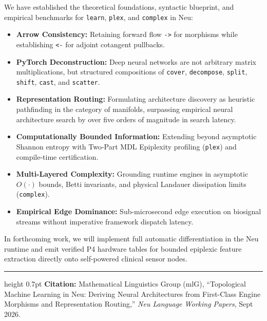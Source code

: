 \documentclass[11pt]{article}
\begin{document}
We have established the theoretical foundations, syntactic blueprint, and empirical benchmarks for \texttt{learn}, \texttt{plex}, and \texttt{complex} in Neu:
\begin{itemize}
    \item \textbf{Arrow Consistency:} Retaining forward flow \texttt{->} for morphisms while establishing \texttt{<-} for adjoint cotangent pullbacks.
    \item \textbf{PyTorch Deconstruction:} Deep neural networks are not arbitrary matrix multiplications, but structured compositions of \texttt{cover}, \texttt{decompose}, \texttt{split}, \texttt{shift}, \texttt{cast}, and \texttt{scatter}.
    \item \textbf{Representation Routing:} Formulating architecture discovery as heuristic pathfinding in the category of manifolds, surpassing empirical neural architecture search by over five orders of magnitude in search latency.
    \item \textbf{Computationally Bounded Information:} Extending beyond asymptotic Shannon entropy with Two-Part MDL Epiplexity profiling (\texttt{plex}) and compile-time certification.
    \item \textbf{Multi-Layered Complexity:} Grounding runtime engines in asymptotic $O(\cdot)$ bounds, Betti invariants, and physical Landauer dissipation limits (\texttt{complex}).
    \item \textbf{Empirical Edge Dominance:} Sub-microsecond edge execution on biosignal streams without imperative framework dispatch latency.
\end{itemize}

In forthcoming work, we will implement full automatic differentiation in the Neu runtime and emit verified P4 hardware tables for bounded epiplexic feature extraction directly onto self-powered clinical sensor nodes.

\vspace{0.6em}
\noindent\hrule height 0.7pt \vspace{0.4em}
{\scriptsize\sffamily\color{commentcolor}
\textbf{Citation:} Mathematical Linguistics Group (mlG), ``Topological Machine Learning in Neu: Deriving Neural Architectures from First-Class Engine Morphisms and Representation Routing,'' \textit{Neu Language Working Papers}, Sept 2026.
}
\end{document}
